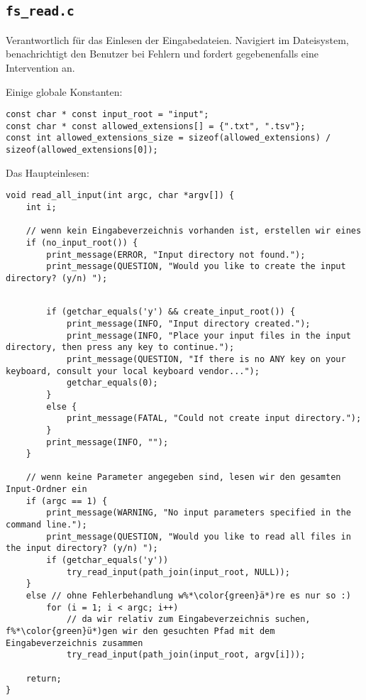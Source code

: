 \documentclass{article}
\begin{document}
\subsection{\texttt{fs\_read.c}}
Verantwortlich für das Einlesen der Eingabedateien. Navigiert im Dateisystem, benachrichtigt den Benutzer bei Fehlern und fordert gegebenenfalls eine Intervention an.

\noindent Einige globale Konstanten:
\begin{lstlisting}
const char * const input_root = "input";
const char * const allowed_extensions[] = {".txt", ".tsv"};
const int allowed_extensions_size = sizeof(allowed_extensions) / sizeof(allowed_extensions[0]);
\end{lstlisting}

\noindent Das Haupteinlesen:
\begin{lstlisting}
void read_all_input(int argc, char *argv[]) {
    int i;

    // wenn kein Eingabeverzeichnis vorhanden ist, erstellen wir eines
    if (no_input_root()) {
        print_message(ERROR, "Input directory not found.");
        print_message(QUESTION, "Would you like to create the input directory? (y/n) ");
\end{lstlisting}
\begin{lstlisting}

        if (getchar_equals('y') && create_input_root()) {
            print_message(INFO, "Input directory created.");
            print_message(INFO, "Place your input files in the input directory, then press any key to continue.");
            print_message(QUESTION, "If there is no ANY key on your keyboard, consult your local keyboard vendor...");
            getchar_equals(0);
        } 
        else {
            print_message(FATAL, "Could not create input directory.");
        }
        print_message(INFO, "");
    }

    // wenn keine Parameter angegeben sind, lesen wir den gesamten Input-Ordner ein
    if (argc == 1) {
        print_message(WARNING, "No input parameters specified in the command line.");
        print_message(QUESTION, "Would you like to read all files in the input directory? (y/n) ");
        if (getchar_equals('y'))
            try_read_input(path_join(input_root, NULL));
    }
    else // ohne Fehlerbehandlung w%*\color{green}ä*)re es nur so :)
        for (i = 1; i < argc; i++)
            // da wir relativ zum Eingabeverzeichnis suchen, f%*\color{green}ü*)gen wir den gesuchten Pfad mit dem Eingabeverzeichnis zusammen
            try_read_input(path_join(input_root, argv[i]));

    return;
}
\end{lstlisting}
\end{document}
